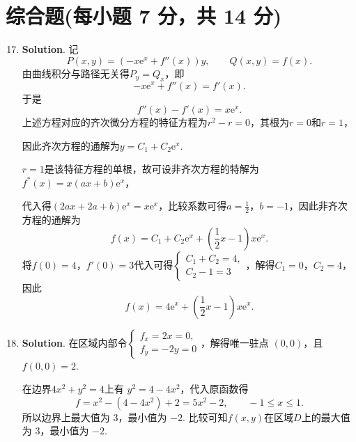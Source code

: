 \documentclass[../main.tex]{subfiles}
\begin{document}
\section{综合题(每小题 7 分，共 14 分)}
\begin{enumerate}
  \setcounter{enumi}{16}
  \item \textbf{Solution}. 记
        \[
          P(x,y)=(-x\mathrm{e}^{x}+f''(x))y,\qquad Q(x,y)=f(x).
        \]
        由曲线积分与路径无关得$P_y=Q_x$，即
        \[
          -x\mathrm{e}^{x}+f''(x)=f'(x).
        \]
        于是
        \[
          f''(x)-f'(x)=x\mathrm{e}^{x}.
        \]
        上述方程对应的齐次微分方程的特征方程为$r^2-r=0$，其根为\(r=0\)和\(r=1\)，

        因此齐次方程的通解为$y=C_1+C_2\mathrm{e}^x$.

        $r=1$是该特征方程的单根，故可设非齐次方程的特解为$f^*(x)=x(ax+b)\mathrm{e}^{x}$，

        代入得$(2ax+2a+b)\mathrm{e}^x=x\mathrm{e}^{x}$，比较系数可得$a=\frac{1}{2}$，$b=-1$，因此非齐次方程的通解为
        \[
          f(x)=C_1+C_2\mathrm{e}^x+\left(\frac{1}{2}x-1\right)x\mathrm{e}^x.
        \]
        将$f(0)=4$，$f'(0)=3$代入可得$\begin{cases}
            C_1+C_2=4, \\
            C_2-1=3
          \end{cases}$，解得$C_1=0$，$C_2=4$，因此
        \[
          f(x)=4\mathrm{e}^x+\left(\frac{1}{2}x-1\right)x\mathrm{e}^x.
        \]

  \item \textbf{Solution}. 在区域内部令$\begin{cases}
            f_x=2x=0, \\
            f_y=-2y=0
          \end{cases}$，解得唯一驻点 \((0,0)\)，且$f(0,0)=2$.

        在边界$4x^2+y^2=4$上有 \(y^2=4-4x^2\)，代入原函数得
        \[
          f=x^2-(4-4x^2)+2=5x^2-2,\qquad -1\le x\le 1.
        \]
        所以边界上最大值为 \(3\)，最小值为 \(-2\). 比较可知$f(x,y)$在区域$D$上的最大值为 \(3\)，最小值为 \(-2\).

\end{enumerate}
\end{document}
